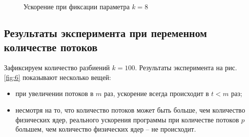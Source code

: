 \documentclass[12pt]{article}
\begin{document}
\begin{figure}[h]
\begin{minipage}{0.45\textwidth}
    \caption{\label{fig:5}Ускорение при фиксации параметра $k = 8$}
\end{minipage}
\end{figure}

\newpage

\subsection{Результаты эксперимента при переменном количестве потоков}

Зафиксируем количество разбиений $k=100$. Результаты эксперимента на рис. \ref{fig:6} показывают несколько вещей:

\begin{itemize}
    \item при увеличении потоков в $m$ раз, ускорение всегда происходит в $t < m$ раз; 
    \item несмотря на то, что количество потоков может быть больше, чем количество физических ядер, реального ускорения программы при количестве потоков $p$ большем, чем количество физических ядер -- не происходит.
\end{itemize}
\end{document}
